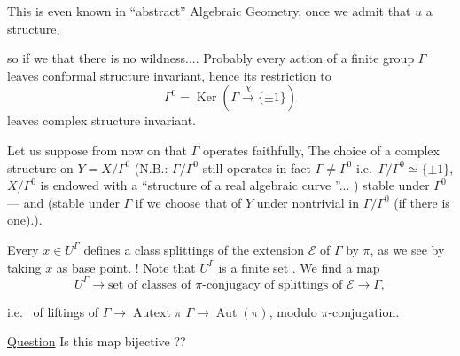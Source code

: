 This is even known in ``abstract'' Algebraic Geometry, once we admit that $u$  a   structure,  


so if we   that there is no wildness.... Probably every action of a finite group $\Gamma$ leaves conformal structure invariant,  hence its restriction to
\[
\Gamma^0=\operatorname{Ker}(\Gamma\xrightarrow{\chi}\{\pm1\})
\]
leaves complex structure invariant.

Let us suppose from now on that $\Gamma$ operates faithfully,   The choice of a complex structure on $Y=X/\Gamma^0$  (N.B.:  $\Gamma/\Gamma^0$ still operates  in fact   $\Gamma\ne\Gamma^0$ i.e.\ $\Gamma/\Gamma^0\simeq\{\pm1\}$, $X/\Gamma^0$ is endowed with a ``structure of a  real algebraic curve ''... ) stable under $\Gamma^0$ --- and (stable under $\Gamma$ if we choose that of $Y$   under  nontrivial in $\Gamma/\Gamma^0$ (if there is one).).

 Every $x\in U^\Gamma$ defines a class   splittings of the extension $\mathcal E$ of $\Gamma$ by $\pi$, as we see by taking $x$ as base point. ! Note that $U^\Gamma$ is a finite set \inserted{if $\Gamma^0\ne1$, [i.e.\ $\Gamma$ not reduced to an \deleted{\illegible{1}} \unsure{anti-involution} \illegible{1})}.
We find  a map
\[
U^\Gamma\longrightarrow\text{set of classes of }\pi\text{-conjugacy of splittings of }\mathcal E\longrightarrow\Gamma,
\]


i.e.\  of liftings of $\Gamma\longrightarrow\operatorname{Autext}\pi$  $\Gamma\longrightarrow\operatorname{Aut}(\pi)$, modulo $\pi$-conjugation.

\uline{Question}  Is this map bijective ??

